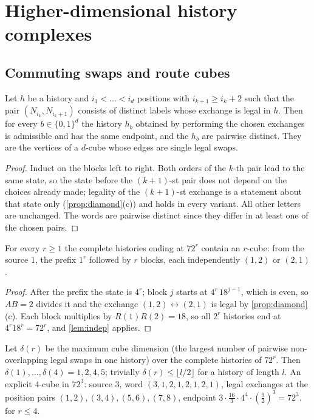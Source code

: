 \section{Higher-dimensional history complexes}\label{sec:complexes}
\subsection{Commuting swaps and route cubes}
\begin{lemma}\label{lem:indep}
Let $h$ be a history and $i_1<\dots<i_d$ positions with $i_{k+1}\ge i_k+2$ such that the pair $(N_{i_k},N_{i_k+1})$ consists of distinct labels whose exchange is legal in $h$. Then for every $b\in\{0,1\}^d$ the history $h_b$ obtained by performing the chosen exchanges is admissible and has the same endpoint, and the $h_b$ are pairwise distinct. They are the vertices of a $d$-cube whose edges are single legal swaps.
\end{lemma}
\begin{proof}
Induct on the blocks left to right. Both orders of the $k$-th pair lead to the same state, so the state before the $(k+1)$-st pair does not depend on the choices already made; legality of the $(k+1)$-st exchange is a statement about that state only (\cref{prop:diamond}(c)) and holds in every variant. All other letters are unchanged. The words are pairwise distinct since they differ in at least one of the chosen pairs.
\end{proof}
\begin{theorem}\label{thm:cube}
For every $r\ge1$ the complete histories ending at $72^r$ contain an $r$-cube: from the source $1$, the prefix $1^r$ followed by $r$ blocks, each independently $(1,2)$ or $(2,1)$.
\end{theorem}
\begin{proof}
After the prefix the state is $4^r$; block $j$ starts at $4^r\,18^{j-1}$, which is even, so $AB=2$ divides it and the exchange $(1,2)\leftrightarrow(2,1)$ is legal by \cref{prop:diamond}(c). Each block multiplies by $R(1)R(2)=18$, so all $2^r$ histories end at $4^r18^r=72^r$, and \cref{lem:indep} applies.
\end{proof}
\begin{proposition}\label{prop:cubedim}
Let $\delta(r)$ be the maximum cube dimension (the largest number of pairwise non-overlapping legal swaps in one history) over the complete histories of $72^r$. Then $\delta(1),\dots,\delta(4)=1,2,4,5$; trivially $\delta(r)\le\lfloor l/2\rfloor$ for a history of length $l$. An explicit $4$-cube in $72^3$: source $3$, word $(3,1,2,1,2,1,2,1)$, legal exchanges at the position pairs $(1,2),(3,4),(5,6),(7,8)$, endpoint $3\cdot\frac{16}3\cdot4^4\cdot(\frac92)^3=72^3$.  for $r\le4$.
\end{proposition}
